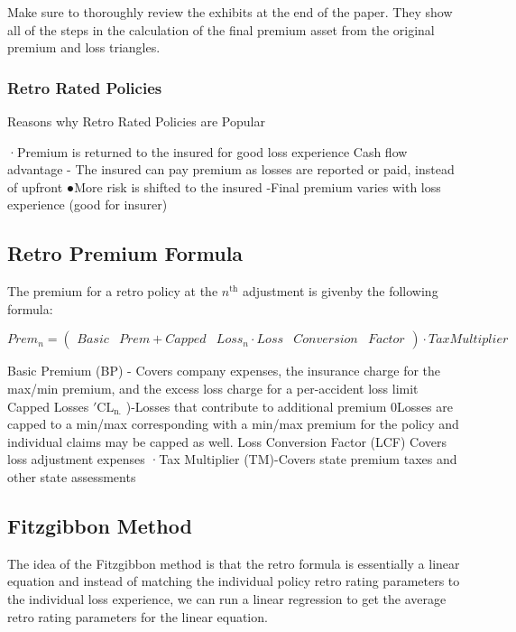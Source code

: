 \documentclass[
]{article}
\begin{document}
Make sure to thoroughly review the exhibits at the end of the paper.
They show all of the steps in the calculation of the final premium asset
from the original premium and loss triangles.

\subsubsection{Retro Rated Policies}\label{retro-rated-policies}

Reasons why Retro Rated Policies are Popular

·Premium is returned to the insured for good loss experience Cash flow
advantage - The insured can pay premium as losses are reported or paid,
instead of upfront ●More risk is shifted to the insured -Final premium
varies with loss experience (good for insurer)

\subsection{Retro Premium Formula}\label{retro-premium-formula}

The premium for a retro policy at the \(n^\mathrm{th}\) adjustment is
givenby the following formula:

\[Prem_{n}=\left(\begin{matrix}Basic&Prem+Capped&Loss_{n}\cdot Loss&Conversion&Factor\end{matrix}\right)\cdot TaxMultiplier\]

Basic Premium (BP) - Covers company expenses, the insurance charge for
the max/min premium, and the excess loss charge for a per-accident loss
limit Capped Losses \(\mathrm{'CL}_{\mathrm{n.}}\) )-Losses that
contribute to additional premium 0Losses are capped to a min/max
corresponding with a min/max premium for the policy and individual
claims may be capped as well. Loss Conversion Factor (LCF) Covers loss
adjustment expenses ·Tax Multiplier (TM)-Covers state premium taxes and
other state assessments

\subsection{Fitzgibbon Method}\label{fitzgibbon-method}

The idea of the Fitzgibbon method is that the retro formula is
essentially a linear equation and instead of matching the individual
policy retro rating parameters to the individual loss experience, we can
run a linear regression to get the average retro rating parameters for
the linear equation.
\end{document}
